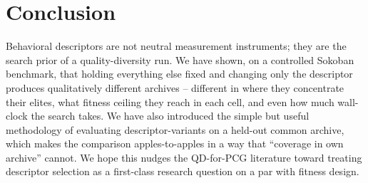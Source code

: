 \documentclass[conference]{IEEEtran}
\begin{document}
\section{Conclusion}
\label{sec:conclusion}

Behavioral descriptors are not neutral measurement instruments;
they are the search prior of a quality-diversity run. We have
shown, on a controlled Sokoban benchmark, that holding everything
else fixed and changing only the descriptor produces
qualitatively different archives -- different in where they
concentrate their elites, what fitness ceiling they reach in each
cell, and even how much wall-clock the search takes. We have also
introduced the simple but useful methodology of evaluating
descriptor-variants on a held-out common archive, which makes the
comparison apples-to-apples in a way that ``coverage in own
archive'' cannot. We hope this nudges the QD-for-PCG literature
toward treating descriptor selection as a first-class research
question on a par with fitness design.



\end{document}
